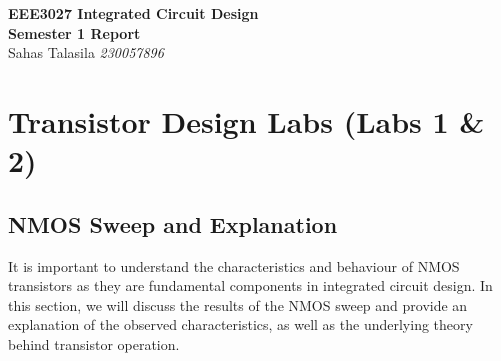 \documentclass[a4paper,12pt]{article}
\begin{document}
\begin{titlepage}
    \centering
    \vspace*{2cm}
    \Huge{\textbf{EEE3027 Integrated Circuit Design}}\\[0.5cm]
    \Large{\textbf{Semester 1 Report}}\\ 
    \Large{Sahas Talasila \textit{230057896}}
    \vfill
\end{titlepage}

\tableofcontents
\newpage

\begin{abstract}
This report documents the results and explanations of the laboratory exercises conducted as part of the EEE3027 Integrated Circuit Design course.
\begin{enumerate}
  \item \href{https://github.com/SahasT23/EEE3027_Project_ST/tree/main/ICDesign/Images}{Images used in the report}
  \item \href{https://github.com/SahasT23/EEE3027_Project_ST/tree/main/ICDesign/Code/LTSpiceCode}{LTSpice Code}
  \item \href{https://github.com/SahasT23/EEE3027_Project_ST/tree/main/ICDesign/Code/FPGASolutionCode}{FPGA Solution Code}
  \item \href{https://github.com/SahasT23/EEE3027_Project_ST/tree/main/ICDesign/Code/WorkFiles}{Work Files}
  \item \href{https://github.com/SahasT23/EEE3027_Project_ST/tree/main/ICDesign/Code/WorkFiles/VME/VHDL}{VHDL Files (Translated)}
\end{enumerate}
\end{abstract}

\section{Transistor Design Labs \- (Labs 1 \& 2)}

\subsection{NMOS Sweep and Explanation}

It is important to understand the characteristics and behaviour of NMOS transistors as they are fundamental components in integrated circuit design. 
In this section, we will discuss the results of the NMOS sweep and provide an explanation of the observed characteristics, as well as the underlying theory behind transistor operation.
\end{document}
